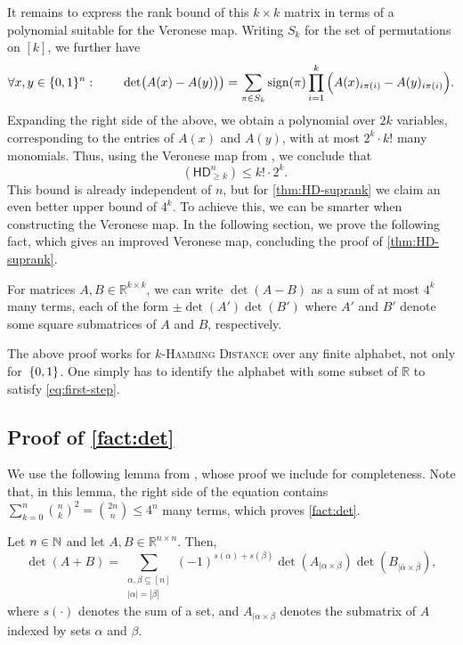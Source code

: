 \documentclass{article}
\DeclareMathOperator{\suprank}{rank_0}
\newcommand{\HD}[1]{\mathsf{HD}_{#1}}
\newcommand{\R}{\mathbb{R}}
\begin{document}
It remains to express the rank bound of this $k\times k$ matrix in terms of a polynomial suitable for the Veronese map. Writing $S_k$ for the set of permutations on $[k]$, we further have
\[
\forall x,y\in \{0,1\}^n\,\colon\qquad \det\!\big(A(x)-A(y)\big)\big) = \sum_{\pi\in S_k}\operatorname{sign}(\pi)\prod_{i = 1}^k \Big(A(x)_{i\pi(i)}-A(y)_{i\pi(i)}\Big).
\]
Expanding the right side of the above, we obtain a polynomial over $2k$ variables, corresponding to the entries of $A(x)$ and $A(y)$, with at most $2^k\cdot k!$ many monomials. Thus, using the Veronese map from , we conclude that
\[
\suprank(\HD{\geq k}^n) \leq k!\cdot 2^k.
\]
This bound is already independent of $n$, but for \cref{thm:HD-suprank} we claim an even better upper bound of $4^k$. To achieve this, we can be smarter when constructing the Veronese map. In the following section, we prove the following fact, which gives an improved Veronese map, concluding the proof of \cref{thm:HD-suprank}.

\begin{proposition}\label{fact:det}
    For matrices $A,B\in \R^{k\times k}$, we can write $\det(A-B)$ as a sum of at most $4^k$ many terms, each of the form $\pm \det(A')\det(B')$ where $A'$ and $B'$ denote some square submatrices of $A$ and $B$, respectively.
\end{proposition}

\begin{remark}
\label{remark:large-alphabet}
The above proof works for \textsc{$k$-Hamming Distance} over any finite alphabet, not only for~$\{0,1\}$. One simply has to identify the alphabet with some subset of $\R$ to satisfy \cref{eq:first-step}.
\end{remark}

\subsection{Proof of \texorpdfstring{\cref{fact:det}}{Proposition}}\label{sec:improving-bound}

We use the following lemma from \cite{Mar90}, whose proof we include for completeness. Note that, in this lemma, the right side of the equation contains $\sum_{k = 0}^n\binom{n}{k}^2 = \binom{2n}{n}\leq 4^n$ many terms, which proves \cref{fact:det}.

\begin{boxlemma}\label{lemma:det-of-sum}
	Let $n\in\mathbb{N}$ and let $A,B\in \R^{n\times n}$. Then,
	\[
	\det(A+B) = \sum_{\substack{\alpha,\beta \subseteq [n]\\[1mm] |\alpha| = |\beta|}} (-1)^{s(\alpha)+s(\beta)}\det(A_{|\alpha\times \beta})\det(B_{|\bar\alpha\times \bar\beta}),
	\]
	where $s(\cdot)$ denotes the sum of a set, and $A_{|\alpha \times \beta}$ denotes the submatrix of $A$ indexed by sets $\alpha$ and $\beta$.
\end{boxlemma}
\end{document}

